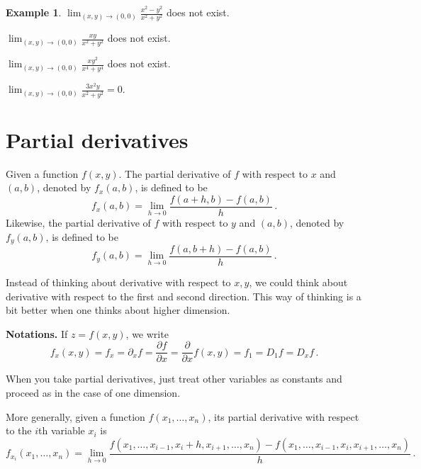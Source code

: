 \documentclass[
]{book}
\theoremstyle{definition}
\theoremstyle{definition}
\newtheorem{example}{Example}[chapter]
\theoremstyle{definition}
\theoremstyle{definition}
\theoremstyle{remark}
\begin{document}
\begin{example}
\(\lim_{(x,y)\to (0,0)} \frac{x^2 - y^2}{x^2 + y^2}\) does not exist.

\(\lim_{(x,y)\to (0,0)} \frac{xy}{x^2 + y^2}\) does not exist.

\(\lim_{(x,y)\to (0,0)} \frac{xy^2}{x^4 + y^4}\) does not exist.

\(\lim_{(x,y)\to (0,0)} \frac{3x^2y}{x^2 + y^2} = 0\).
\end{example}

\section{Partial derivatives}\label{partial-derivatives-1}

Given a function \(f(x,y)\). The partial derivative of \(f\) with respect to \(x\) and \((a,b)\),
denoted by \(f_x(a,b)\), is defined to be
\begin{equation*}
    f_x(a,b) = \lim_{h\to 0} \frac{ f(a+h,b) - f(a,b)}{h} \,.
\end{equation*}
Likewise, the partial derivative of \(f\) with respect to \(y\) and \((a,b)\),
denoted by \(f_y(a,b)\), is defined to be
\begin{equation*}
    f_y(a,b) = \lim_{h\to 0} \frac{ f(a,b+h) - f(a,b)}{h} \,.
\end{equation*}

Instead of thinking about derivative with respect to \(x,y\), we could think
about derivative with respect to the first and second direction.
This way of thinking is a bit better when one thinks about higher dimension.

\textbf{Notations.} If \(z = f(x,y)\), we write
\begin{equation*}
    f_x(x,y) = f_x = \partial_x f =  \frac{\partial f}{\partial x} = \frac{\partial}{\partial x} f(x,y) = f_1 = D_1 f = D_x f \,.
\end{equation*}

When you take partial derivatives, just treat other variables as constants and proceed as
in the case of one dimension.

More generally,
given a function \(f(x_1, \dots, x_n)\), its partial derivative with respect
to the \(i\)th variable \(x_i\) is
\begin{equation*}
    f_{x_i}(x_1, \dots, x_n) 
    = \lim_{h\to 0} \frac{ f(x_1, \dots, x_{i-1}, x_i + h , x_{i+1}, \dots, x_n) - f(x_1, \dots, x_{i-1}, x_i  , x_{i+1}, \dots, x_n)}{h} \,.
\end{equation*}
\end{document}
